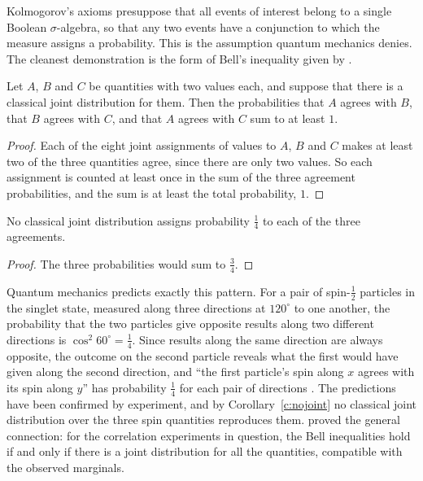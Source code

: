 \documentclass{situationist-preprint}
\begin{document}
Kolmogorov's axioms presuppose that all events of interest belong to a single Boolean $\sigma$-algebra, so that any two events have a conjunction to which the measure assigns a probability. This is the assumption quantum mechanics denies. The cleanest demonstration is the form of Bell's inequality given by \citet{Wigner1970}.

\begin{theorem}\label{t:wigner}
Let $A$, $B$ and $C$ be quantities with two values each, and suppose that there is a classical joint distribution for them. Then the probabilities that $A$ agrees with $B$, that $B$ agrees with $C$, and that $A$ agrees with $C$ sum to at least $1$.
\end{theorem}

\begin{proof}
Each of the eight joint assignments of values to $A$, $B$ and $C$ makes at least two of the three quantities agree, since there are only two values. So each assignment is counted at least once in the sum of the three agreement probabilities, and the sum is at least the total probability, $1$.
\end{proof}

\begin{corollary}\label{c:nojoint}
No classical joint distribution assigns probability $\frac{1}{4}$ to each of the three agreements.
\end{corollary}

\begin{proof}
The three probabilities would sum to $\frac{3}{4}$.
\end{proof}

Quantum mechanics predicts exactly this pattern. For a pair of spin-$\frac{1}{2}$ particles in the singlet state, measured along three directions at $120^\circ$ to one another, the probability that the two particles give opposite results along two different directions is $\cos^2 60^\circ = \frac{1}{4}$. Since results along the same direction are always opposite, the outcome on the second particle reveals what the first would have given along the second direction, and \enquote{the first particle's spin along $x$ agrees with its spin along $y$} has probability $\frac{1}{4}$ for each pair of directions \citep{Mermin1981}. The predictions have been confirmed by experiment, and by Corollary~\ref{c:nojoint} no classical joint distribution over the three spin quantities reproduces them. \citet{Fine1982} proved the general connection: for the correlation experiments in question, the Bell inequalities hold if and only if there is a joint distribution for all the quantities, compatible with the observed marginals.
\end{document}
